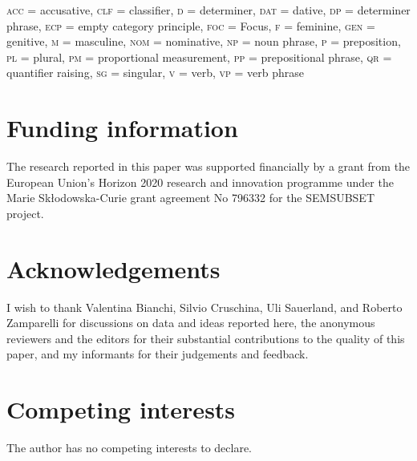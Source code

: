 \documentclass[charis, linguex]{glossa}
\begin{document}
\textsc{acc} = accusative, \textsc{clf} = classifier, \textsc{d} = determiner, \textsc{dat} = dative, \textsc{dp} = determiner phrase, \textsc{ecp} = empty category principle, \textsc{foc} = Focus, \textsc{f} = feminine, \textsc{gen} = genitive, \textsc{m} = masculine, \textsc{nom} = nominative, \textsc{np} = noun phrase, \textsc{p} = preposition, \textsc{pl} = plural, \textsc{pm} = proportional measurement, \textsc{pp} = prepositional phrase, \textsc{qr} = quantifier raising, \textsc{sg} = singular, \textsc{v} = verb, \textsc{vp} = verb phrase

\section*{Funding information}

The research reported in this paper was supported financially by a grant from the European Union’s Horizon 2020 research and innovation programme under the Marie Skło\-dow\-ska\--Cu\-rie grant agreement No 796332 for the SEMSUBSET project.

\section*{Acknowledgements}

I wish to thank Valentina Bianchi, Silvio Cruschina, Uli Sauerland, and Roberto Zam\-pa\-rel\-li for discussions on data and ideas reported here, the anonymous reviewers and the editors for their substantial contributions to the quality of this paper, and my informants for their judgements and feedback.

\section*{Competing interests}

The author has no competing interests to declare.
	

\end{document}
